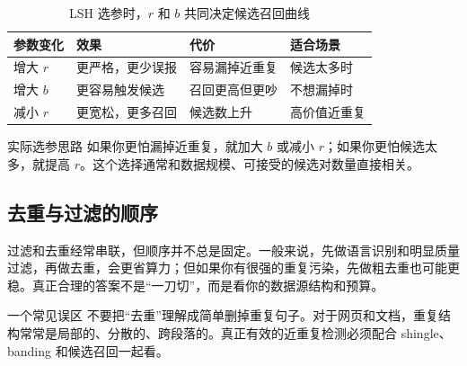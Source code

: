 \begin{table}[H]
\centering
\small
\renewcommand{\arraystretch}{1.15}
\begin{tabular}{p{2.4cm}p{4.1cm}p{4.0cm}p{3.0cm}}
\toprule
\textbf{参数变化} & \textbf{效果} & \textbf{代价} & \textbf{适合场景} \\
\midrule
增大 $r$ & 更严格，更少误报 & 容易漏掉近重复 & 候选太多时 \\
增大 $b$ & 更容易触发候选 & 召回更高但更吵 & 不想漏掉时 \\
减小 $r$ & 更宽松，更多召回 & 候选数上升 & 高价值近重复 \\
\bottomrule
\end{tabular}
\caption{LSH 选参时，$r$ 和 $b$ 共同决定候选召回曲线}
\end{table}

\begin{importantbox}{实际选参思路}
如果你更怕漏掉近重复，就加大 $b$ 或减小 $r$；如果你更怕候选太多，就提高 $r$。这个选择通常和数据规模、可接受的候选对数量直接相关。
\end{importantbox}

\subsection{去重与过滤的顺序}

过滤和去重经常串联，但顺序并不总是固定。一般来说，先做语言识别和明显质量过滤，再做去重，会更省算力；但如果你有很强的重复污染，先做粗去重也可能更稳。真正合理的答案不是“一刀切”，而是看你的数据源结构和预算。

\begin{warningbox}{一个常见误区}
不要把“去重”理解成简单删掉重复句子。对于网页和文档，重复结构常常是局部的、分散的、跨段落的。真正有效的近重复检测必须配合 shingle、banding 和候选召回一起看。
\end{warningbox}

